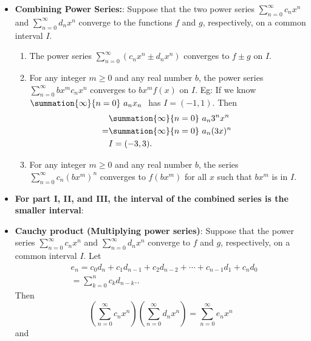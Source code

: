 \documentclass{report}
\begin{document}
\begin{itemize}
        \item \textbf{Combining Power Series:}:
            Suppose that the two power series \(\sum_{n=0}^{\infty} c_n x^n\) and \(\sum_{n=0}^{\infty} d_n x^n\) converge to the functions \(f\) and \(g\), respectively, on a common interval \(I\).
            \begin{enumerate}[label=(\roman*)]
                \item The power series \(\sum_{n=0}^{\infty} (c_n x^n \pm d_n x^n)\) converges to \(f \pm g\) on \(I\).
                \item For any integer \(m \geq 0\) and any real number \(b\), the power series \(\sum_{n=0}^{\infty} b x^m c_n x^n\) converges to \(b x^m f(x)\) on \(I\).
                    \smallbreak \noindent
                    Eg: If we know $\summation{\infty}{n=0}\ a_{n}x_{n}\  $ has $I = (-1,1) $. Then
                    \begin{align*}
                            &\summation{\infty}{n=0}\ a_{n}3^{n}x^{n}\  \\
                        =&\summation{\infty}{n=0}\ a_{n}(3x)^{n}\  \\
                         &I=(-3,3)
                     .\end{align*}
                 \item For any integer \(m \geq 0\) and any real number \(b\), the series \(\sum_{n=0}^{\infty} c_n (b x^m)^n\) converges to \(f(b x^m)\) for all \(x\) such that \(b x^m\) is in \(I\).
             \end{enumerate}
         \item \textbf{For part I, II, and III, the interval of the combined series is the smaller interval}:
         \item \textbf{Cauchy product (Multiplying power series)}:
             Suppose that the power series \(\sum_{n=0}^{\infty} c_n x^n\) and \(\sum_{n=0}^{\infty} d_n x^n\) converge to \(f\) and \(g\), respectively, on a common interval \(I\). Let
             \begin{align*}
                    &e_n = c_0 d_n + c_1 d_{n-1} + c_2 d_{n-2} + \cdots + c_{n-1} d_1 + c_n d_0  \\
                    &= \sum_{k=0}^{n} c_k d_{n-k}.
                .\end{align*}
                Then
                \[
                    \left( \sum_{n=0}^{\infty} c_n x^n \right) \left( \sum_{n=0}^{\infty} d_n x^n \right) = \sum_{n=0}^{\infty} e_n x^n
                \]
                and
                \[
\]
\end{itemize}
\end{document}
